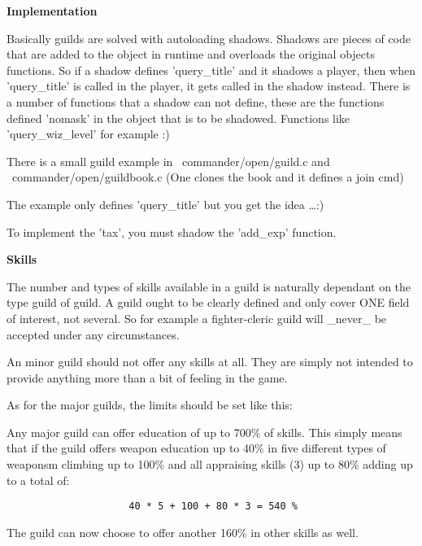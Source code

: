 {\bf Implementation}

Basically guilds are solved with autoloading shadows. Shadows are pieces
of code that are added to the object in runtime and overloads the original
objects functions. So if a shadow defines 'query\_title' and it shadows
a player, then when 'query\_title' is called in the player, it gets called
in the shadow instead. There is a number of functions that a shadow can
not define, these are the functions defined 'nomask' in the object that is
to be shadowed. Functions like 'query\_wiz\_level' for example :)

There is a small guild example in ~commander/open/guild.c and
~commander/open/guildbook.c (One clones the book and it defines a join cmd)

The example only defines 'query\_title' but you get the idea \ldots :)

To implement the 'tax', you must shadow the 'add\_exp' function.

{\bf Skills}

The number and types of skills available in a guild is naturally dependant
on the type guild of guild. A guild ought to be clearly defined and only
cover ONE field of interest, not several. So for example a fighter-cleric
guild will \_never\_ be accepted under any circumstances.

An minor guild should not offer any skills at all. They are simply not
intended to provide anything more than a bit of feeling in the game.

As for the major guilds, the limits should be set like this:

Any major guild can offer education of up to 700\% of skills. This simply
means that if the guild offers weapon education up to 40\% in five different
types of weaponsm climbing up to 100\% and all appraising skills (3) up to
80\% adding up to a total of: 
\begin{verbatim}
                     40 * 5 + 100 + 80 * 3 = 540 %
\end{verbatim}
The guild can now choose to offer another 160\% in other skills as well.

